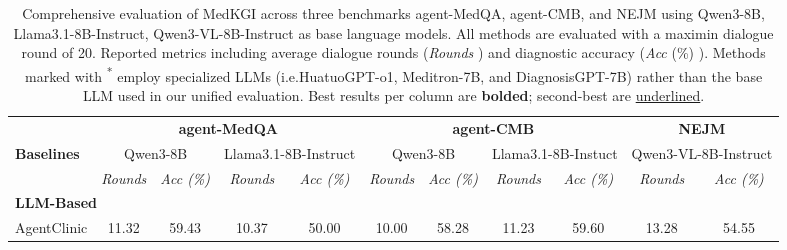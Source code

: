 \documentclass[11pt]{article}
\newcommand{\ie}{i.e.{\xspace}}
\newcommand{\tool}{MedKGI{\xspace}}
\begin{document}
\begin{table}[t]
	\caption{Comprehensive evaluation of \tool{} across three benchmarks agent-MedQA, agent-CMB, and NEJM using Qwen3-8B, Llama3.1-8B-Instruct, Qwen3-VL-8B-Instruct as base language models. 
		All methods are evaluated with a maximin dialogue round of 20.
		Reported metrics including average dialogue rounds (\textit{Rounds} \boldsymbol{$\downarrow$}) and diagnostic accuracy (\textit{Acc} (\%) \boldsymbol{$\uparrow$}).
		Methods marked with \textsuperscript{*} employ specialized LLMs (\ie HuatuoGPT-o1, Meditron-7B, and DiagnosisGPT-7B) rather than the base LLM used in our unified evaluation. 
		Best results per column are \textbf{bolded}; second-best are \underline{underlined}.}
	\label{table1}
	\setlength{\tabcolsep}{3pt}
	\renewcommand{\arraystretch}{1.4}
	\small
	\centering
	\begin{tabular}{lcccccccccc}
		\toprule 
		\multicolumn{1}{l|}{} & \multicolumn{4}{c|}{\textbf{agent-MedQA}}                                                 & \multicolumn{4}{c|}{\textbf{agent-CMB}}                                                  & \multicolumn{2}{c}{\textbf{NEJM}}                 \\ \cmidrule(l){2-11} 
		\multicolumn{1}{l|}{\multirow{1}{*}{\textbf{Baselines}}}                           & \multicolumn{2}{c}{Qwen3-8B}   & \multicolumn{2}{c|}{Llama3.1-8B-Instruct} & \multicolumn{2}{c}{Qwen3-8B}   & \multicolumn{2}{c|}{Llama3.1-8B-Instuct} & \multicolumn{2}{c}{Qwen3-VL-8B-Instruct} \\ \cmidrule(l){2-11} 
		\multicolumn{1}{l|}{}                           & \textit{Rounds}        & \textit{Acc (\%)}        & \textit{Rounds}            & \multicolumn{1}{c|}{\textit{Acc (\%)}}             & \textit{Rounds}        & \textit{Acc (\%)}       & \textit{Rounds}             & \textit{Acc (\%)}            & \textit{Rounds}             & \textit{Acc (\%)}             \\ \midrule
		\multicolumn{11}{l}{\cellcolor[HTML]{F2F2F2}\textbf{LLM-Based}}                                                                                                                                                                                               \\
		\multicolumn{1}{l|}{AgentClinic}                & 11.32         & 59.43          & 10.37                  & \multicolumn{1}{c|}{50.00}                     & 10.00         & 58.28          &  11.23                  & \multicolumn{1}{c|}{59.60}                   & 13.28                   & 54.55                    \\

\end{tabular}
\end{table}
\end{document}
